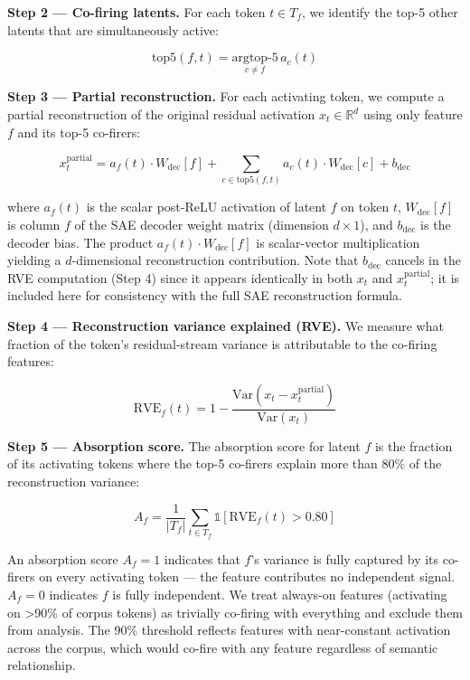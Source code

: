\documentclass{article}
\begin{document}
\textbf{Step 2 --- Co-firing latents.} For each token $t \in T_f$, we identify the top-5 other latents that are simultaneously active:

\begin{equation}
\text{top5}(f, t) = \underset{c \neq f}{\text{argtop-5}} \, a_c(t)
\end{equation}

\textbf{Step 3 --- Partial reconstruction.} For each activating token, we compute a partial reconstruction of the original residual activation $x_t \in \mathbb{R}^d$ using only feature $f$ and its top-5 co-firers:

\begin{equation}
x_t^{\text{partial}} = a_f(t) \cdot W_{\text{dec}}[f] + \sum_{c \in \text{top5}(f, t)} a_c(t) \cdot W_{\text{dec}}[c] + b_{\text{dec}}
\end{equation}

where $a_f(t)$ is the scalar post-ReLU activation of latent $f$ on token $t$, $W_{\text{dec}}[f]$ is column $f$ of the SAE decoder weight matrix (dimension $d \times 1$), and $b_{\text{dec}}$ is the decoder bias. The product $a_f(t) \cdot W_{\text{dec}}[f]$ is scalar-vector multiplication yielding a $d$-dimensional reconstruction contribution. Note that $b_{\text{dec}}$ cancels in the RVE computation (Step 4) since it appears identically in both $x_t$ and $x_t^{\text{partial}}$; it is included here for consistency with the full SAE reconstruction formula.

\textbf{Step 4 --- Reconstruction variance explained (RVE).} We measure what fraction of the token's residual-stream variance is attributable to the co-firing features:

\begin{equation}
\text{RVE}_f(t) = 1 - \frac{\text{Var}(x_t - x_t^{\text{partial}})}{\text{Var}(x_t)}
\end{equation}

\textbf{Step 5 --- Absorption score.} The absorption score for latent $f$ is the fraction of its activating tokens where the top-5 co-firers explain more than 80\% of the reconstruction variance:

\begin{equation}
A_f = \frac{1}{|T_f|} \sum_{t \in T_f} \mathbb{1}[\text{RVE}_f(t) > 0.80]
\end{equation}

An absorption score $A_f = 1$ indicates that $f$'s variance is fully captured by its co-firers on every activating token --- the feature contributes no independent signal. $A_f = 0$ indicates $f$ is fully independent. We treat always-on features (activating on >90\% of corpus tokens) as trivially co-firing with everything and exclude them from analysis. The 90\% threshold reflects features with near-constant activation across the corpus, which would co-fire with any feature regardless of semantic relationship.
\end{document}
